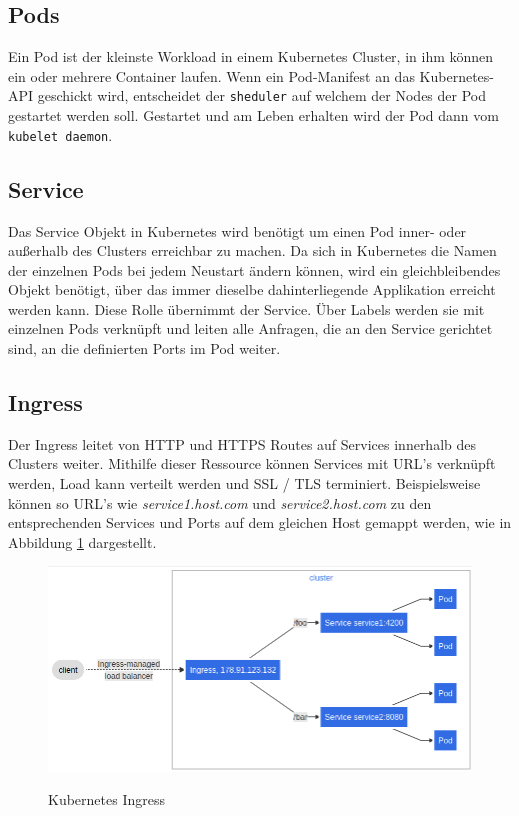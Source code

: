 \subsection{Pods}
Ein Pod ist der kleinste Workload in einem Kubernetes Cluster, in ihm können ein oder mehrere Container laufen.
Wenn ein Pod-Manifest an das Kubernetes-\ac{API} geschickt wird, entscheidet der \texttt{sheduler} auf welchem der Nodes der Pod gestartet werden soll.
Gestartet und am Leben erhalten wird der Pod dann vom \texttt{kubelet daemon}.
\cite[S.63]{Kubernetes_up_and_running}

\subsection{Service}
Das Service Objekt in Kubernetes wird benötigt um einen Pod inner- oder außerhalb des Clusters erreichbar zu machen.
Da sich in Kubernetes die Namen der einzelnen Pods bei jedem Neustart ändern können, wird ein gleichbleibendes Objekt benötigt, über das immer dieselbe dahinterliegende Applikation erreicht werden kann.
Diese Rolle übernimmt der Service.
Über Labels werden sie mit einzelnen Pods verknüpft und leiten alle Anfragen, die an den Service gerichtet sind, an die definierten Ports im Pod weiter.
\cite[S.86]{Kubernetes_up_and_running}

\subsection{Ingress}
Der Ingress leitet von \ac{HTTP} und \ac{HTTPS} Routes auf Services innerhalb des Clusters weiter.
Mithilfe dieser Ressource können Services mit \ac{URL}'s verknüpft werden, Load kann verteilt werden und \ac{SSL} / \ac{TLS} terminiert.
Beispielsweise können so \ac{URL}'s wie \textit{service1.host.com} und \textit{service2.host.com} zu den entsprechenden Services und Ports auf dem gleichen Host gemappt werden, wie in Abbildung \ref{fig:ingress} dargestellt.
\cite{kubernetes_ingress}
\begin{figure}[ht]
        \caption{Kubernetes Ingress\cite{kubernetes_ingress}}
        \centering
        \includegraphics[width=\textwidth]{bilder/kubernetes_ingress.png}
        \label{fig:ingress}
\end{figure}

